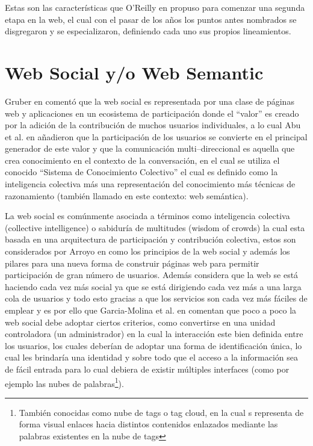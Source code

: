 \documentclass[oneside,12pt,a4paper]{memoir}%
\begin{document}
	Estas son las caracter\'isticas que O'Reilly en \cite{OReilly2007} propuso para
	comenzar una segunda etapa en la web, el cual con el pasar de los a\~nos los puntos
	antes nombrados se disgregaron y se especializaron, definiendo cada uno sus
	propios lineamientos.
	
	\section{Web Social y/o Web Semantic}
	\label{sec:SSWeb}
	Gruber en \cite{Gruber2008} coment\'o que la web social es representada por
	una clase de p\'aginas web y aplicaciones en un ecosistema de participaci\'on
	donde el ``valor'' es creado por la adici\'on de la contribuci\'on de muchos
	usuarios individuales, a lo cual Abu et al. en \cite{Bani2011} a\~nadieron que
	la participaci\'on de los usuarios se convierte en el principal generador de
	este valor y que la comunicaci\'on multi--direccional es aquella que crea
	conocimiento en el contexto de la conversaci\'on, en el cual se utiliza el
	conocido ``Sistema de Conocimiento Colectivo'' el cual es definido como la
	inteligencia colectiva m\'as una representaci\'on del conocimiento m\'as
	t\'ecnicas de razonamiento (tambi\'en llamado en este contexto: web
	sem\'antica).
	
	La web social es com\'unmente asociada a t\'erminos como inteligencia colectiva
	(collective intelligence) o sabidur\'ia de multitudes (wisdom of crowds) la
	cual esta basada en una arquitectura de participaci\'on y contribuci\'on
	colectiva, estos son considerados por Arroyo en \cite{Arroyo2007} como los
	principios de la web social y adem\'as los pilares para una nueva forma de
	construir p\'aginas web para permitir participaci\'on de gran n\'umero de
	usuarios. Adem\'as considera que la web se est\'a haciendo cada vez m\'as
	social ya que se est\'a dirigiendo cada vez m\'as a una larga cola de usuarios
	y todo esto gracias a que los servicios son cada vez m\'as f\'aciles de emplear
	y es por ello que Garcia-Molina et al. en \cite{Heymann2007} comentan que poco
	a poco la web social debe adoptar ciertos criterios, como convertirse en una
	unidad controladora (un administrador) en la cual la interacci\'on este bien
	definida entre los usuarios, los cuales deber\'ian de adoptar una forma de
	identificaci\'on \'unica, lo cual les brindar\'ia una identidad y sobre todo 
	que el acceso a la informaci\'on sea de f\'acil entrada para lo cual debiera de
	existir m\'ultiples interfaces (como por ejemplo las nubes de
	palabras\footnote{Tambi\'en conocidas como nube de tags o tag cloud, en la cual
	s representa de forma visual enlaces hacia distintos contenidos enlazados
	mediante las palabras existentes en la nube de tags}).
\end{document}
